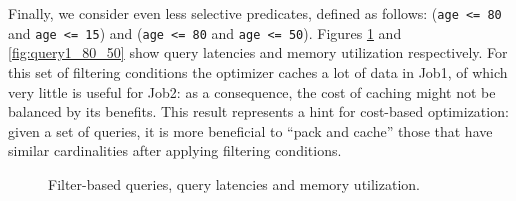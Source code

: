 Finally, we consider even less selective predicates, defined as follows: (\texttt{age <= 80} and \texttt{age <= 15}) and (\texttt{age <= 80} and \texttt{age <= 50}). Figures \ref{fig:query1_80_15} and \ref{fig:query1_80_50} show query latencies and memory utilization respectively. For this set of filtering conditions the optimizer caches a lot of data in Job1, of which very little is useful for Job2: as a consequence, the cost of caching might not be balanced by its benefits. This result represents a hint for cost-based optimization: given a set of queries, it is more beneficial to ``pack and cache'' those that have similar cardinalities after applying filtering conditions.

\begin{figure}[htbp]
	\centering



   \caption{Filter-based queries, query latencies and memory utilization.}
   \label{fig:query1_80_15}
\end{figure}

